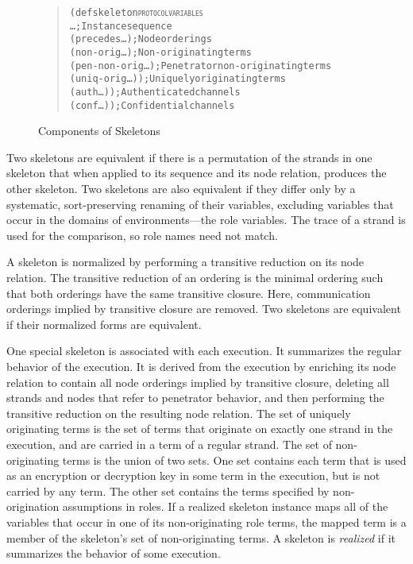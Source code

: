 \documentclass[12pt]{article}
\begin{document}
\begin{figure}
\begin{quote}
\begin{alltt}
(defskeleton \textsc{protocol} \textsc{variables}
   \ldots                ; Instance sequence
   (precedes \ldots)     ; Node orderings
   (non-orig \ldots)     ; Non-originating terms
   (pen-non-orig \ldots) ; Penetrator non-originating terms
   (uniq-orig \ldots))   ; Uniquely originating terms
   (auth \ldots))        ; Authenticated channels
   (conf \ldots))        ; Confidential channels
\end{alltt}
\end{quote}
\caption{Components of Skeletons}\label{fig:skeleton}
\end{figure}

Two skeletons are equivalent if there is a permutation of the strands
in one skeleton that when applied to its sequence and its node
relation, produces the other skeleton.  Two skeletons are also
equivalent if they differ only by a systematic, sort-preserving
renaming of their variables, excluding variables that occur in the
domains of environments---the role variables.  The trace of a strand
is used for the comparison, so role names need not match.

A skeleton is normalized by performing a transitive reduction on its
node relation.  The transitive reduction
of an ordering is the minimal ordering such that both orderings have
the same transitive closure.  Here, communication orderings implied by
transitive closure are removed.  Two skeletons are equivalent if their
normalized forms are equivalent.

One special skeleton is associated with each execution.  It summarizes
the regular behavior of the execution.  It is derived from the
execution by enriching its node relation to contain all node orderings
implied by transitive closure, deleting all strands and nodes that
refer to penetrator behavior, and then performing the transitive
reduction on the resulting node relation.  The set of uniquely
originating terms is the set of terms that originate on exactly one
strand in the execution, and are carried in a term of a regular
strand.  The set of non-originating terms is the union of two sets.
One set contains each term that is used as an encryption or decryption
key in some term in the execution, but is not carried by any term.
The other set contains the terms specified by non-origination
assumptions in roles.  If a realized skeleton instance maps all of the
variables that occur in one of its non-originating role terms, the
mapped term is a member of the skeleton's set of non-originating
terms.  A skeleton is \emph{realized} if it
summarizes the behavior of some execution.
\end{document}

